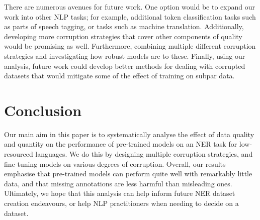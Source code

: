 \documentclass{article}
\begin{document}
There are numerous avenues for future work. One option would be to expand our work into other NLP tasks; for example, additional token classification tasks such as parts of speech tagging, or tasks such as machine translation. Additionally, developing more corruption strategies that cover other components of quality would be promising as well. Furthermore, combining multiple different corruption strategies and investigating how robust models are to these. Finally, using our analysis, future work could develop better methods for dealing with corrupted datasets that would mitigate some of the effect of training on subpar data.
\section{Conclusion}
Our main aim in this paper is to systematically analyse the effect of data quality and quantity on the performance of pre-trained models on an NER task for low-resourced languages. We do this by designing multiple corruption strategies, and fine-tuning models on various degrees of corruption.
Overall, our results emphasise that pre-trained models can perform quite well with remarkably little data, and that missing annotations are less harmful than misleading ones. Ultimately, we hope that this analysis can help inform future NER dataset creation endeavours, or help NLP practitioners when needing to decide on a dataset.


\end{document}

